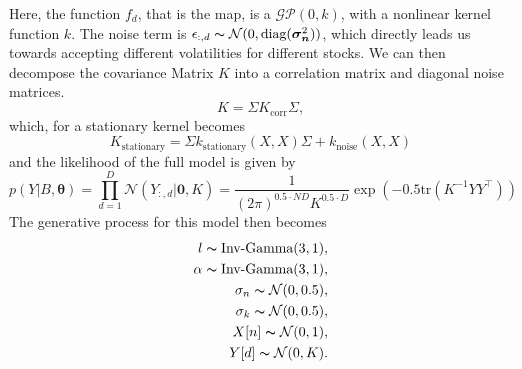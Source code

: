 Here, the function $f_d$, that is the map, is a $\mathcal{GP}(0,k)$, with a nonlinear kernel function $k$. The noise term is $\epsilon_{:,d} \thicksim \mathcal{N}(0,\text{diag}(\bm{\sigma_{n}}^2))$, which directly leads us towards accepting different volatilities for different stocks. We can then decompose the covariance Matrix $K$ into a correlation matrix and diagonal noise matrices. 
\begin{equation}%
	K = \Sigma K_{\text{corr}} \Sigma,
	\label{eq:covariance_decomposition}
\end{equation}
which, for a stationary kernel becomes
\begin{equation}%
	K_{\text{stationary}} = \Sigma k_{\text{stationary}}(X,X) \Sigma + k_{\text{noise}}(X,X)
	\label{eq:stationary_decomposition}
\end{equation}
and the likelihood of the full model is given by
\begin{equation}%
	p(Y|B,\bm{\theta}) = \prod_{d=1}^{D} \mathcal{N}(Y_{:,d}|\bm{0}, K) = \frac{1}{(2\pi)^{0.5 \cdot ND} K^{0.5 \cdot D}} \exp(-0.5\text{tr}(K^{-1}YY^{\top}))
	\label{eq:gplvm_likelihood}
\end{equation}
The generative process for this model then becomes
\begin{subequations}%
	\label{eq:generative_process_gplvm_finance}
	\begin{align}
		l \thicksim \text{Inv-Gamma}(3,1),         \nonumber \\
		\alpha \thicksim \text{Inv-Gamma}(3,1),         \nonumber \\
		\sigma_n \thicksim \mathcal{N}(0,0.5),         \nonumber \\
		\sigma_k \thicksim \mathcal{N}(0,0.5),         \nonumber \\
		X[n] \thicksim \mathcal{N}(0,1),         \nonumber \\
		Y[d] \thicksim \mathcal{N}(0,K).          \\
	\end{align}
\end{subequations}


